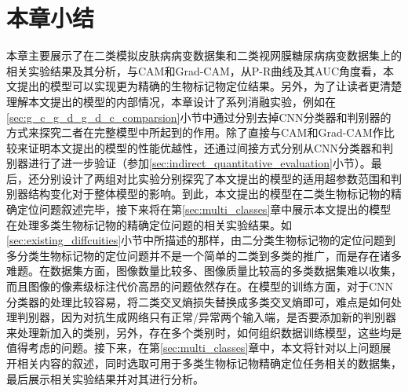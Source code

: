 \section{本章小结}
本章主要展示了在二类模拟皮肤病病变数据集和二类视网膜糖尿病病变数据集上的相关实验结果及其分析，与CAM和Grad-CAM，从P-R曲线及其AUC角度看，本文提出的模型可以实现更为精确的生物标记物定位结果。另外，为了让读者更清楚理解本文提出的模型的内部情况，本章设计了系列消融实验，例如在\ref{sec:g_c_g_d_g_d_c_comparsion}小节中通过分别去掉CNN分类器和判别器的方式来探究二者在完整模型中所起到的作用。除了直接与CAM和Grad-CAM作比较来证明本文提出的模型的性能优越性，还通过间接方式分别从CNN分类器和判别器进行了进一步验证（参加\ref{sec:indirect_quantitative_evaluation}小节）。最后，还分别设计了两组对比实验分别探究了本文提出的模型的适用超参数范围和判别器结构变化对于整体模型的影响。到此，本文提出的模型在二类生物标记物的精确定位问题叙述完毕，接下来将在第\ref{sec:multi_classes}章中展示本文提出的模型在处理多类生物标记物的精确定位问题的相关实验结果。如\ref{sec:existing_diffcuities}小节中所描述的那样，由二分类生物标记物的定位问题到多分类生物标记物的定位问题并不是一个简单的二类到多类的推广，而是存在诸多难题。在数据集方面，图像数量比较多、图像质量比较高的多类数据集难以收集，而且图像的像素级标注代价高昂的问题依然存在。在模型的训练方面，对于CNN分类器的处理比较容易，将二类交叉熵损失替换成多类交叉熵即可，难点是如何处理判别器，因为对抗生成网络只有正常/异常两个输入端，是否要添加新的判别器来处理新加入的类别，另外，存在多个类别时，如何组织数据训练模型，这些均是值得考虑的问题。接下来，在第\ref{sec:multi_classes}章中，本文将针对以上问题展开相关内容的叙述，同时选取可用于多类生物标记物精确定位任务相关的数据集，最后展示相关实验结果并对其进行分析。


